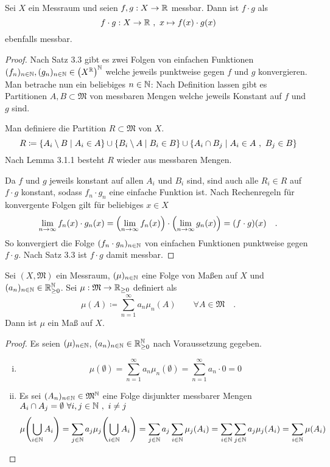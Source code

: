 \documentclass{anablatt}
\begin{document}
\makeheader
\task
\ttask
\begin{theorem}
Sei $X$ ein Messraum und seien $f,g : X \rightarrow \mathbb{R}$ messbar. Dann ist $f \cdot g$ als
\[ f \cdot g: X \rightarrow \mathbb{R} ~,~ x \mapsto f(x) \cdot g(x) \]
ebenfalls messbar.
\end{theorem}
\begin{proof}
Nach Satz 3.3 gibt es zwei Folgen von einfachen Funktionen $(f_n)_{n \in \mathbb{N}}, (g_n)_{n \in \mathbb{N}} \in \qty(X^{\mathbb{R}})^{\mathbb{N}}$ welche jeweils punktweise gegen $f$ und $g$ konvergieren. Man betrache nun ein beliebiges $n \in \mathbb{N}$: Nach Definition lassen gibt es Partitionen $A, B \subset \mathfrak M$ von messbaren Mengen welche jeweils Konstant auf $f$ und $g$ sind.

Man definiere die Partition $R \subset \mathfrak M$ von $X$.
\[
    R \coloneqq \qty{A_i\setminus B \mid A_i \in A} \cup \qty{B_i\setminus A \mid B_i \in B} \cup \qty{A_i \cap B_j \mid A_i \in A~,~ B_j \in B}
\]
Nach Lemma 3.1.1 besteht $R$ wieder aus messbaren Mengen.

Da $f$ und $g$ jeweils konstant auf allen $A_i$ und $B_i$ sind, sind auch alle $R_i \in R$ auf $f \cdot g$ konstant, sodass $f_n \cdot g_n$ eine einfache Funktion ist. Nach Rechenregeln für konvergente Folgen gilt für beliebiges $x \in X$
\[ \lim_{n \rightarrow \infty} f_n(x)\cdot g_n(x) = \qty(\lim_{n \rightarrow \infty}f_n(x)) \cdot \qty (\lim_{n \rightarrow \infty} g_n(x)) = (f \cdot g)(x) \quad.\]
So konvergiert die Folge $(f_n \cdot g_n)_{n\in\mathbb{N}}$ von einfachen Funktionen punktweise gegen $f \cdot g$. Nach Satz 3.3 ist $f \cdot g$ damit messbar.
\end{proof}
\ttask
\begin{theorem}
Sei $(X, \mathfrak M)$ ein Messraum, $(\mu)_{n\in\mathbb{N}}$ eine Folge von Maßen auf $X$ und $(a_n)_{n\in\mathbb{N}} \in \mathbb{R}_{\geq0}^{\mathbb{N}}$. Sei $\mu : \mathfrak M \rightarrow \mathbb{R}_{\geq0}$ definiert als
\[ \mu(A) \coloneqq \sum_{n=1}^\infty a_n\mu_n(A) \qquad \forall A \in \mathfrak M \quad. \]
Dann ist $\mu$ ein Maß auf $X$.
\end{theorem}
\begin{proof} Es seien $(\mu)_{n\in\mathbb{N}}$, $(a_n)_{n\in\mathbb{N}} \in \mathbb{R}_{\geq0}^{\mathbb{N}}$ nach Voraussetzung gegeben.
\begin{enumerate}[(i)]
    \item
        \[ \mu(\emptyset) = \sum_{n=1}^\infty a_n\mu_n(\emptyset) 
        = \sum_{n=1}^\infty a_n\cdot0 = 0 \]
    \item Es sei $(A_n)_{n\in\mathbb{N}} \in \mathfrak M^{\mathbb{N}}$ eine Folge disjunkter messbarer Mengen $A_i \cap A_j = \emptyset ~\forall i,j \in \mathbb{N}~,~i \neq j$
        \[
            \mu\qty(\bigcup_{i \in \mathbb{N}} A_i)
            =\sum_{j\in\mathbb{N}} a_j\mu_j\qty(\bigcup_{i \in \mathbb{N}} A_i)
            =\sum_{j\in\mathbb{N}} a_j\sum_{i \in \mathbb{N}} \mu_j(A_i)
            =\sum_{i\in\mathbb{N}} \sum_{j \in \mathbb{N}} a_j\mu_j(A_i)
            =\sum_{i\in\mathbb{N}} \mu(A_i)
        \]
\end{enumerate}
\end{proof}
\end{document}

